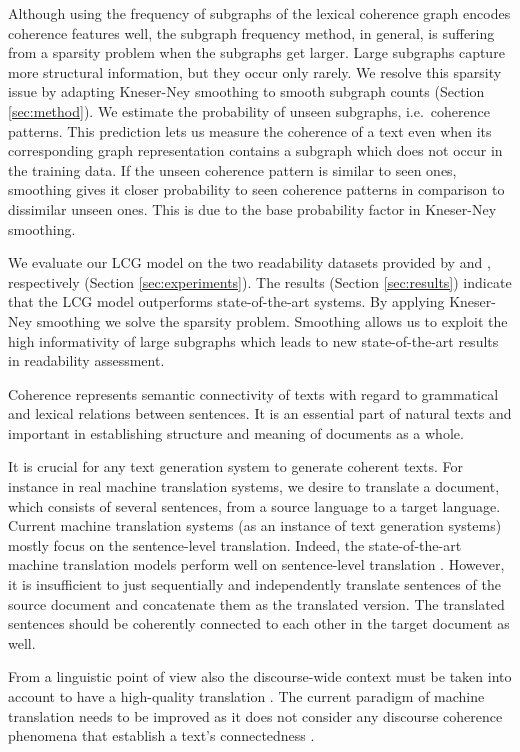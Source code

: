 Although using the frequency of subgraphs of the lexical coherence
graph encodes coherence features well, the subgraph frequency method,
in general, is suffering from a sparsity problem when the subgraphs
get larger. Large subgraphs capture more structural information, but
they occur only rarely. We resolve this sparsity issue by adapting
Kneser-Ney smoothing \cite{heafield13} to smooth subgraph counts
(Section \ref{sec:method}). We estimate the probability of unseen subgraphs, i.e.\ coherence patterns. This prediction lets us measure the coherence of a
text even when its corresponding graph representation contains a
subgraph which does not occur in the training data. If the unseen
coherence pattern is similar to seen ones, smoothing gives it closer
probability to seen coherence patterns in comparison to dissimilar
unseen ones. This is due to the base probability factor in Kneser-Ney
smoothing.

We evaluate our LCG model on the two readability datasets provided by  and , respectively (Section
\ref{sec:experiments}).  The results (Section \ref{sec:results}) indicate that
the LCG model outperforms state-of-the-art systems. By applying Kneser-Ney smoothing we solve the sparsity problem. Smoothing allows us to exploit the high informativity of large subgraphs which leads to new state-of-the-art results in readability assessment.

Coherence represents semantic connectivity of texts with regard to grammatical and lexical relations between sentences. 
It is an essential part of natural texts and important in establishing structure and meaning of documents as a whole.

It is crucial for any text generation system to generate coherent texts.  
For instance in real machine translation systems,  we desire to translate a document, which consists of several sentences, from a source language to a target language. 
Current machine translation systems (as an instance of text generation systems) mostly focus on the sentence-level translation. 
Indeed, the state-of-the-art machine translation models perform well on sentence-level translation \cite{Bahdanau2015,Sennrich2017}. 
However, it is insufficient to just sequentially and independently translate sentences of the source document and concatenate them as the translated version. 
The translated sentences should be coherently connected to each other in the target document as well.

From a linguistic point of view also the discourse-wide context must be taken into account to have a high-quality translation \cite{Hatim1990,Hardmeier2012a}. The current paradigm of machine translation needs to be improved as it does not consider any discourse coherence phenomena that establish a text's connectedness \cite{Smith2015}.

